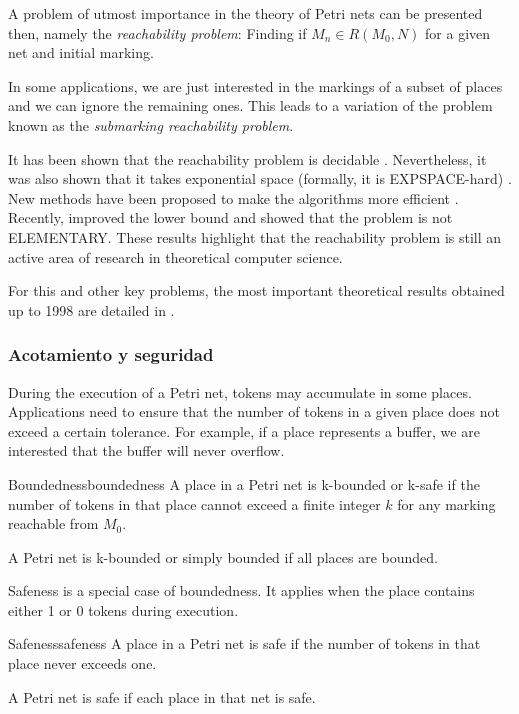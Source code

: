 A problem of utmost importance in the theory of Petri nets can be presented then,
namely the \emph{reachability problem}:
Finding if $M_n \in R(M_0, N)$ for a given net and initial marking.

In some applications, we are just interested in the markings of a subset of places
and we can ignore the remaining ones.
This leads to a variation of the problem known as the \emph{submarking reachability problem}.

It has been shown that the reachability problem is decidable \cite{mayr1981}.
Nevertheless, it was also shown that it takes exponential space
(formally, it is EXPSPACE-hard) \cite{lipton1976}.
New methods have been proposed to make the algorithms more efficient \cite{kungas2005petri}.
Recently, \cite{czerwinski2020reachability} improved
the lower bound and showed that the problem is not ELEMENTARY.
These results highlight that the reachability problem is still
an active area of research in theoretical computer science.

For this and other key problems, the most important theoretical results
obtained up to 1998 are detailed in \cite{esparza1994decidability}.

\subsubsection{Acotamiento y seguridad}

During the execution of a Petri net, tokens may accumulate in some places.
Applications need to ensure that the number of tokens in a given place does not
exceed a certain tolerance.
For example, if a place represents a buffer,
we are interested that the buffer will never overflow.

\begin{definition}{Boundedness}{boundedness}
      A place in a Petri net is k-bounded or k-safe
      if the number of tokens in that place cannot exceed a finite integer $k$
      for any marking reachable from $M_0$.

      A Petri net is k-bounded or simply bounded if all places are bounded.
\end{definition}

Safeness is a special case of boundedness.
It applies when the place contains either 1 or 0 tokens during execution.

\begin{definition}{Safeness}{safeness}
      A place in a Petri net is safe if the number of tokens in that place never exceeds one.

      A Petri net is safe if each place in that net is safe.
\end{definition}

